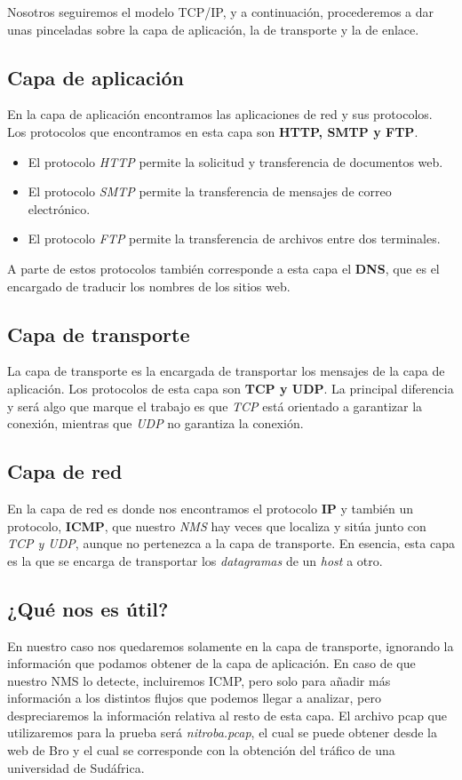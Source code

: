 Nosotros seguiremos el modelo TCP/IP, y a continuación, procederemos a dar 
unas pinceladas sobre la capa de aplicación, la de transporte y la de enlace.

\subsection{Capa de aplicación}

En la capa de aplicación encontramos las aplicaciones de red y sus protocolos. 
Los protocolos que encontramos en esta capa son \textbf{HTTP, SMTP y FTP}. 
\intro
\begin{itemize}
\item El protocolo \textit{HTTP} permite la solicitud y transferencia de documentos web.
\item El protocolo \textit{SMTP} permite la transferencia de mensajes de correo electrónico.
\item El protocolo \textit{FTP} permite la transferencia de archivos entre dos terminales.
\end{itemize}

A parte de estos protocolos también corresponde a esta capa el \textbf{DNS}, 
que es el encargado de traducir los nombres de los sitios web.

\subsection{Capa de transporte}

La capa de transporte es la encargada de transportar los mensajes de la capa de aplicación. 
Los protocolos de esta capa son \textbf{TCP y UDP}. La principal diferencia y será algo que 
marque el trabajo es que \textit{TCP} está orientado a garantizar la conexión, mientras que \textit{UDP} no 
garantiza la conexión.

\subsection{Capa de red}

En la capa de red es donde nos encontramos el protocolo \textbf{IP} y también 
un protocolo, \textbf{ICMP}, que nuestro \textit{NMS} hay veces que localiza y 
sitúa junto con \textit{TCP y UDP}, aunque no pertenezca a la capa de transporte.
\intro
En esencia, esta capa es la que se encarga de transportar los \textit{datagramas} 
de un \textit{host} a otro.

\subsection{¿Qué nos es útil?}

En nuestro caso nos quedaremos solamente en la capa de transporte, 
ignorando la información que podamos obtener de la capa 
de aplicación. En caso de que nuestro NMS lo detecte, incluiremos ICMP, 
pero solo para añadir más 
información a los distintos flujos que podemos llegar a analizar, 
pero despreciaremos la información relativa al resto de esta capa. 
El archivo pcap que utilizaremos para la prueba será \textit{nitroba.pcap}, 
el cual se puede obtener desde la web de Bro y el cual se corresponde con 
la obtención del tráfico de una universidad de Sudáfrica.
